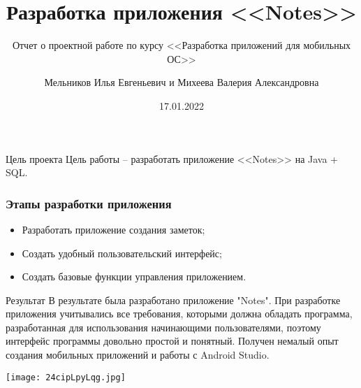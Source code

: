 \documentclass[9pt]{beamer}
\title{Разработка приложения <<Notes>>}
\subtitle{Отчет о проектной работе по курсу <<Разработка приложений для мобильных ОС>>}
\author{Мельников Илья Евгеньевич и Михеева Валерия Александровна}
\date{17.01.2022}
\begin{document}
\maketitle

\begin{frame}[fragile]{Цель проекта}
    Цель работы -- разработать приложение <<Notes>> на Java + SQL.

\end{frame}

\begin{frame}
    \frametitle{Этапы разработки приложения}
    \begin{itemize}
        \item Разработать приложение создания заметок;
        \item Создать удобный пользовательский интерфейс;
        \item Создать базовые функции управления приложением.
    \end{itemize}
\end{frame}

\begin{frame}[fragile]{Результат}
    В результате была разработано приложение "Notes". При разработке приложения учитывались все требования, которыми должна обладать программа, разработанная для использования начинающими пользователями, поэтому интерфейс программы довольно простой и понятный. Получен немалый опыт создания мобильных приложений и работы с Android Studio.

    \begin{center}
        \texttt{[image: 24cipLpyLqg.jpg]}
    \end{center}

\end{frame}
\end{document}
